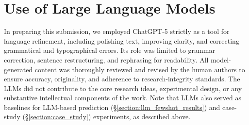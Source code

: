 

\section{Use of Large Language Models}
In preparing this submission, we employed ChatGPT-5 strictly as a tool for language refinement, including polishing text, improving clarity, and correcting grammatical and typographical errors. Its role was limited to grammar correction, sentence restructuring, and rephrasing for readability. All model-generated content was thoroughly reviewed and revised by the human authors to ensure accuracy, originality, and adherence to research-integrity standards. The LLMs did not contribute to the core research ideas, experimental design, or any substantive intellectual components of the work. Note that LLMs also served as baselines for LLM-based prediction (\S\ref{section:llm_fewshot_results}) and case-study (\S\ref{section:case_study}) experiments, as described above.